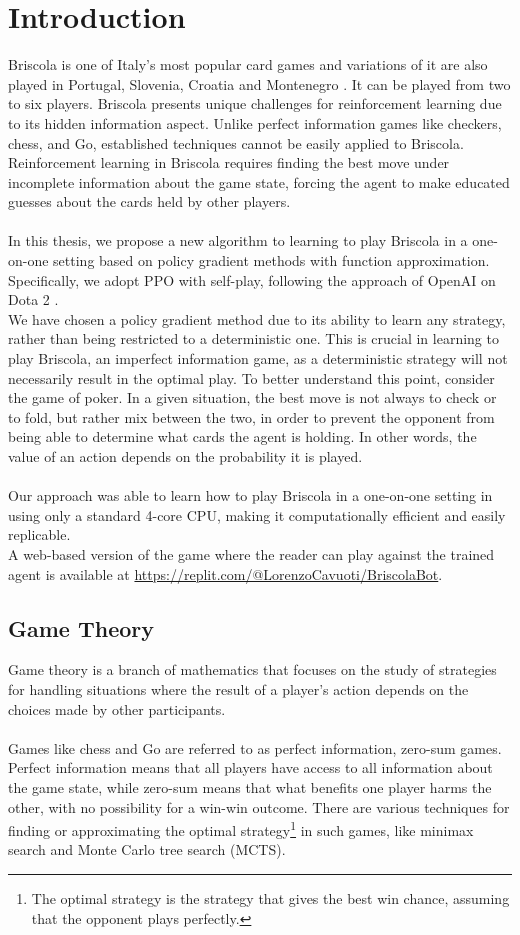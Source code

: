 \chapter{Introduction}
Briscola is one of Italy's most popular card games and variations of it are also played in Portugal, Slovenia, Croatia and Montenegro \cite{briscola-wikipedia}. It can be played from two to six players. Briscola presents unique challenges for reinforcement learning due to its hidden information aspect. Unlike perfect information games like checkers, chess, and Go, established techniques cannot be easily applied to Briscola. Reinforcement learning in Briscola requires finding the best move under incomplete information about the game state, forcing the agent to make educated guesses about the cards held by other players.\\\\
In this thesis, we propose a new algorithm to learning to play Briscola in a one-on-one setting based on policy gradient methods with function approximation. Specifically, we adopt PPO with self-play, following the approach of OpenAI on Dota 2 \cite{open-ai-five}.\\
We have chosen a policy gradient method due to its ability to learn any strategy, rather than being restricted to a deterministic one. This is crucial in learning to play Briscola, an imperfect information game, as a deterministic strategy will not necessarily result in the optimal play. To better understand this point, consider the game of poker. In a given situation, the best move is not always to check or to fold, but rather mix between the two, in order to prevent the opponent from being able to determine what cards the agent is holding. In other words, the value
of an action depends on the probability it is played.\\\\
Our approach was able to learn how to play Briscola in a one-on-one setting in using only a standard 4-core CPU, making it computationally efficient and easily replicable.\\
A web-based version of the game where the reader can play against the trained agent is available at \url{https://replit.com/@LorenzoCavuoti/BriscolaBot}.

\section{Game Theory}
Game theory is a branch of mathematics that focuses on the study of strategies for handling situations where the result of a player's action depends on the choices made by other participants.\\\\
Games like chess and Go are referred to as perfect information, zero-sum games. Perfect information means that all players have access to all information about the game state, while zero-sum means that what benefits one player harms the other, with no possibility for a win-win outcome. There are various techniques for finding or approximating the optimal strategy\footnote{The optimal strategy is the strategy that gives the best win chance, assuming that the opponent plays perfectly.} in such games, like minimax search and Monte Carlo tree search (MCTS).

